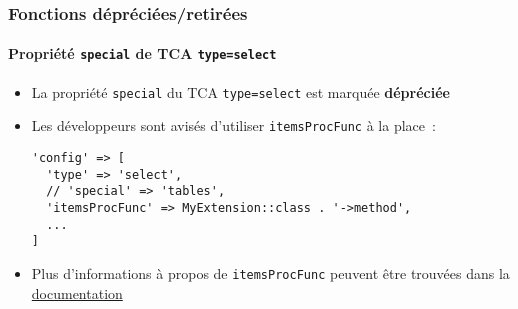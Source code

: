 %

\begin{frame}[fragile]
	\frametitle{Fonctions dépréciées/retirées}
	\framesubtitle{Propriété \texttt{special} de TCA \texttt{type=select}}


	\begin{itemize}
		\item La propriété \texttt{special} du TCA \texttt{type=select}
			est marquée \textbf{dépréciée}
		\item Les développeurs sont avisés d'utiliser \texttt{itemsProcFunc} à la place~:
\begin{lstlisting}
'config' => [
  'type' => 'select',
  // 'special' => 'tables',
  'itemsProcFunc' => MyExtension::class . '->method',
  ...
]
\end{lstlisting}

		\item Plus d'informations à propos de \texttt{itemsProcFunc} peuvent être trouvées dans la
		 	\href{https://docs.typo3.org/m/typo3/reference-tca/master/en-us/ColumnsConfig/CommonProperties/ItemsProcFunc.html}{documentation}
	\end{itemize}

\end{frame}

